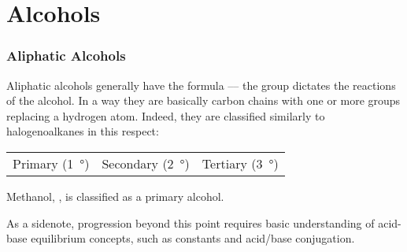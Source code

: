 

\pagebreak
\hypertarget{ChapterAlcohols}{}
\part{Alcohols}

	\section{Aliphatic Alcohols}
		Aliphatic alcohols generally have the formula  –– the  group dictates the reactions of the alcohol. In a way they
		are basically carbon chains with one or more  groups replacing a hydrogen atom. Indeed, they are classified similarly to
		halogenoalkanes in this respect:

		\begin{center}\begin{table}[ht]\renewcommand{\arraystretch}{1.4}
		\begin{tabu} to \textwidth {| X[c,m] | X[c,m] | X[c,m] |}

			\hline
			\vspace{2mm}					\vspace{2mm}	&
			\vspace{2mm}			\vspace{2mm}	&
			\vspace{2mm}		\vspace{2mm}	\\

			\hline
			Primary (\SI{1}{\degree})		&
			Secondary (\SI{2}{\degree})		&
			Tertiary (\SI{3}{\degree})		\\
			\hline

		\end{tabu}
		\end{table}\end{center}\vspace{-10mm}

		Methanol, , is classified as a primary alcohol.

		As a sidenote, progression beyond this point requires basic understanding of acid-base equilibrium concepts, such as \Ka constants
		and acid/base conjugation.

